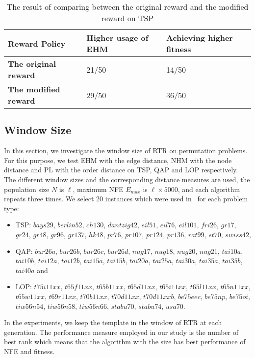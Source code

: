 \begin{table}[htbp]
    \centering
    \begin{tabular}{|l|l|l|}
    \hline
    \textbf{Reward Policy}       &\textbf{Higher usage of EHM}       & \textbf{Achieving higher fitness}  \\ \hline
    \textbf{The original reward} & 21/50 & 14/50   	 \\ \hline
    \textbf{The modified reward} & 29/50 & 36/50	\\ \hline
    \end{tabular} 
    \caption{The result of comparing between the original reward and the modified reward on TSP}
    \label{tb:reward}
\end{table}
\subsection*{Window Size}

In this section, we investigate the window size of RTR on permutation problems. For this purpose, we test EHM with the edge distance, NHM with the node distance and PL with the order distance on TSP, QAP and LOP respectively. The different window sizes and the corresponding distance measures are used, the population size $N$ is $\ell$, maximum NFE $E_{max}$ is $\ell\times 5000$, and each algorithm repeats three times. We select 20 instances which were used in~\cite{ceberio2012review} for each problem type:
\begin{itemize}
    \item TSP: $bays29$, $ berlin52$, $ ch130$, $ dantzig42$, $eil51$, $ eil76$, $eil101$, $ fri26$, $ gr17$, $gr24$, $ gr48$, $ gr96$, $ gr137$, $ hk48$, $ pr76$, $ pr107$, $pr124$, $ pr136$, $rat99$, $st70$, $swiss42$, 
    \item QAP: $bur26a$, $ bur26b$, $ bur26c$, $bur26d$, $ nug17$, $nug18$, $ nug20$, $ nug21$, $tai10a$, $tai10b$, $tai12a$, $tai12b$, $tai15a$, $tai15b$, $tai20a$, $tai25a$, $tai30a$, $tai35a$, $tai35b$, $tai40a$ and
    \item LOP: $t75i11xx$, $t65f11xx$, $ t65b11xx$, $ t65d11xx$, $ t65i11xx$, $t65l11xx$, $ t65n11xx$, $ t65w11xx$, $ t69r11xx$, $t70b11xx$, $ t70d11xx$, $ t70d11xxb$, $be75eec$, $ be75np$, $ be75oi$, $ tiw56n54$, $tiw56n58$, $ tiw56n66$, $stabu70$, $ stabu74$, $ usa70$.
\end{itemize} 
 In the experiments, we keep the template in the window of RTR at each generation. The performance measure employed in our study is the number of best rank which means that the algorithm with the size has best performance of NFE and fitness.

